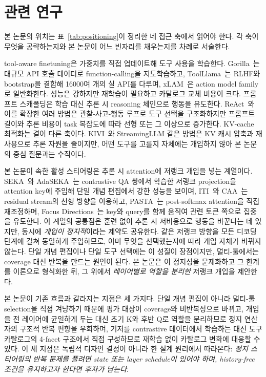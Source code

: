 \section{관련 연구}\label{sec:related}

본 논문의 위치는 표~\ref{tab:positioning}이 정리한 네 접근 축에서 읽어야 한다. 각 축이 무엇을 공략하는지와 본 논문이 어느 빈자리를 채우는지를 차례로 서술한다.

tool-aware finetuning은 가중치를 직접 업데이트해 도구 사용을 학습한다. Gorilla~\citep{patil2023gorilla}는 대규모 API 호출 데이터로 function-calling을 지도학습하고, ToolLlama~\citep{qin2024toolllm}는 RLHF와 bootstrap을 결합해 16000여 개의 실 API를 다루며, xLAM~\citep{zhang2024xlam}은 action model family로 일반화한다. 성능은 강하지만 재학습이 필요하고 카탈로그 교체 비용이 크다. 프롬프트 스캐폴딩은 학습 대신 추론 시 reasoning 체인으로 행동을 유도한다. ReAct~\citep{yao2023react}와 이를 확장한 여러 방법은 관찰-사고-행동 루프로 도구 선택을 구조화하지만 프롬프트 길이와 추론 비용이 task 복잡도에 따라 선형 또는 그 이상으로 증가한다. KV-cache 최적화는 결이 다른 축이다. KIVI~\citep{liu2024kivi}와 StreamingLLM 같은 방법은 KV 캐시 압축과 재사용으로 추론 자원을 줄이지만, 어떤 도구를 고를지 자체에는 개입하지 않아 본 논문의 중심 질문과는 수직이다.

본 논문이 속한 활성 스티어링은 추론 시 attention에 저랭크 개입을 넣는 계열이다. SEKA~\citep{SEKA}와 AdaSEKA~\citep{AdaSEKA}는 contrastive QA 쌍에서 학습한 저랭크 projection을 attention key에 주입해 단일 개념 편집에서 강한 성능을 보이며, ITI~\citep{ITI}와 CAA~\citep{CAA}는 residual stream의 선형 방향을 이용하고, PASTA~\citep{PASTA}는 post-softmax attention을 직접 재조정하며, Focus Directions~\citep{FocusDirections}는 key와 query를 함께 움직여 관련 토큰 쪽으로 집중을 유도한다. 이 계열의 공통점은 훈련 없이 추론 시 저비용으로 행동을 바꾼다는 데 있지만, 동시에 \emph{개입이 정지적}이라는 제약도 공유한다. 같은 저랭크 방향을 모든 디코딩 단계에 걸쳐 동일하게 주입하므로, 이미 무엇을 선택했는지에 따라 개입 자체가 바뀌지 않는다. 단일 개념 편집이나 단일 도구 선택에는 이 성질이 장점이지만, 멀티-툴에서는 coverage 대신 반복을 만드는 원인이 된다. 본 논문은 이 정지성을 문제화하고 그 한계를 이론으로 형식화한 뒤, 그 위에서 \emph{레이어별로 역할을 분리한} 저랭크 개입을 제안한다.

본 논문이 기존 흐름과 갈라지는 지점은 세 가지다. 단일 개념 편집이 아니라 멀티-툴 selection을 직접 겨냥하기 때문에 평가 대상이 coverage와 비반복성으로 바뀌고, 개입을 전 레이어에 균일하게 두는 대신 초기 K와 후반 Q로 역할을 분리하므로 정지 연산자의 구조적 반복 편향을 우회하며, 기저를 contrastive 데이터에서 학습하는 대신 도구 카탈로그의 4-facet 구조에서 직접 구성하므로 재학습 없이 카탈로그 변화에 대응할 수 있다. 이 세 지점은 독립적 디자인 결정이 아니라 한 설계 원리에서 따라온다: \emph{정지 스티어링의 반복 문제를 풀려면 state 또는 layer schedule이 있어야 하며, history-free 조건을 유지하고자 한다면 후자가 남는다}.

